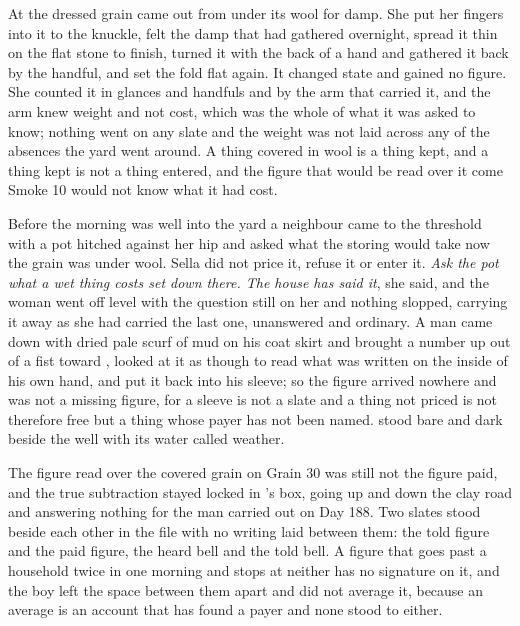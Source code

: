 At  the dressed grain came out from under its wool for damp. She put her fingers into it to the knuckle, felt the damp that had gathered overnight, spread it thin on the flat stone to finish, turned it with the back of a hand and gathered it back by the handful, and set the fold flat again. It changed state and gained no figure. She counted it in glances and handfuls and by the arm that carried it, and the arm knew weight and not cost, which was the whole of what it was asked to know; nothing went on any slate and the weight was not laid across any of the absences the yard went around. A thing covered in wool is a thing kept, and a thing kept is not a thing entered, and the figure that would be read over it come Smoke 10 would not know what it had cost.

\scenebreak

Before the morning was well into the yard a neighbour came to the threshold with a pot hitched against her hip and asked what the storing would take now the grain was under wool. Sella did not price it, refuse it or enter it. \emph{Ask the pot what a wet thing costs set down there. The house has said it}, she said, and the woman went off level with the question still on her and nothing slopped, carrying it away as she had carried the last one, unanswered and ordinary. A man came down  with dried pale scurf of mud on his coat skirt and brought a number up out of a fist toward , looked at it as though to read what was written on the inside of his own hand, and put it back into his sleeve; so the figure arrived nowhere and was not a missing figure, for a sleeve is not a slate and a thing not priced is not therefore free but a thing whose payer has not been named.  stood bare and dark beside the well with its water called weather.

The figure read over the covered grain on Grain 30 was still not the figure paid, and the true subtraction stayed locked in 's box, going up and down the clay road and answering nothing for the man carried out on Day 188. Two slates stood beside each other in the file with no writing laid between them: the told figure and the paid figure, the heard bell and the told bell. A figure that goes past a household twice in one morning and stops at neither has no signature on it, and the boy left the space between them apart and did not average it, because an average is an account that has found a payer and none stood to either.

